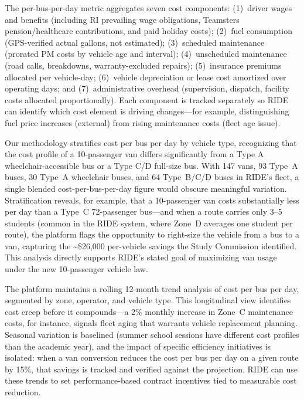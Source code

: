 \begin{description}[style=nextline, leftmargin=0.5cm]
    \item[\faIcon{calculator} \textbf{Cost Components:}] The per-bus-per-day metric aggregates seven cost components: (1)~driver wages and benefits (including RI prevailing wage obligations, Teamsters pension/healthcare contributions, and paid holiday costs); (2)~fuel consumption (GPS-verified actual gallons, not estimated); (3)~scheduled maintenance (prorated PM costs by vehicle age and interval); (4)~unscheduled maintenance (road calls, breakdowns, warranty-excluded repairs); (5)~insurance premiums allocated per vehicle-day; (6)~vehicle depreciation or lease cost amortized over operating days; and (7)~administrative overhead (supervision, dispatch, facility costs allocated proportionally). Each component is tracked separately so RIDE can identify which cost element is driving changes---for example, distinguishing fuel price increases (external) from rising maintenance costs (fleet age issue).

    \item[\faIcon{layer-group} \textbf{Vehicle Type Stratification:}] Our methodology stratifies cost per bus per day by vehicle type, recognizing that the cost profile of a 10-passenger van differs significantly from a Type A wheelchair-accessible bus or a Type C/D full-size bus. With 147 vans, 93 Type~A buses, 30 Type~A wheelchair buses, and 64 Type~B/C/D buses in RIDE's fleet, a single blended cost-per-bus-per-day figure would obscure meaningful variation. Stratification reveals, for example, that a 10-passenger van costs substantially less per day than a Type~C 72-passenger bus---and when a route carries only 3--5 students (common in the RIDE system, where Zone~D averages one student per route), the platform flags the opportunity to right-size the vehicle from a bus to a van, capturing the \textasciitilde\$26,000 per-vehicle savings the Study Commission identified. This analysis directly supports RIDE's stated goal of maximizing van usage under the new 10-passenger vehicle law.

    \item[\faIcon{chart-line} \textbf{Trend Analysis:}] The platform maintains a rolling 12-month trend analysis of cost per bus per day, segmented by zone, operator, and vehicle type. This longitudinal view identifies cost creep before it compounds---a 2\% monthly increase in Zone~C maintenance costs, for instance, signals fleet aging that warrants vehicle replacement planning. Seasonal variation is baselined (summer school sessions have different cost profiles than the academic year), and the impact of specific efficiency initiatives is isolated: when a van conversion reduces the cost per bus per day on a given route by 15\%, that savings is tracked and verified against the projection. RIDE can use these trends to set performance-based contract incentives tied to measurable cost reduction.
\end{description}

